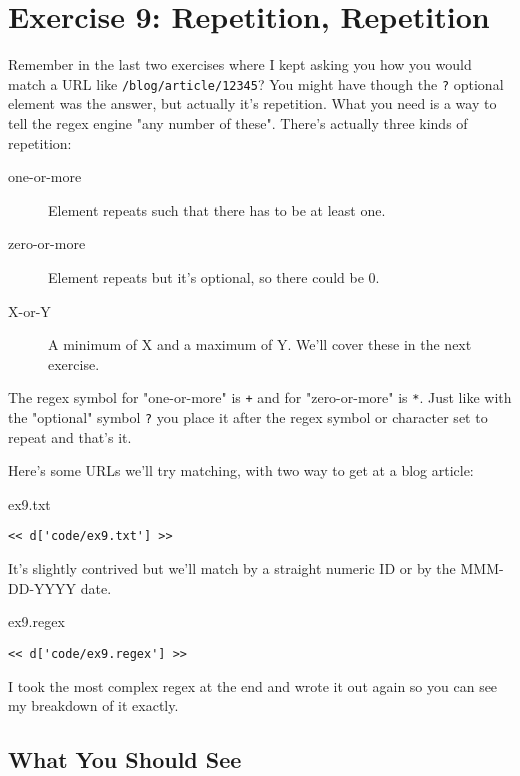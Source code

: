 \chapter{Exercise 9: Repetition, Repetition}

Remember in the last two exercises where I kept asking you how you would match
a URL like \verb|/blog/article/12345|? You might have though the \verb|?| optional
element was the answer, but actually it's repetition.  What you need is a way to
tell the regex engine "any number of these".  There's actually three kinds of
repetition:

\begin{description}
\item[one-or-more] Element repeats such that there has to be at least one.
\item[zero-or-more] Element repeats but it's optional, so there could be 0.
\item[X-or-Y] A minimum of X and a maximum of Y. We'll cover these in the next
    exercise.
\end{description}

The regex symbol for "one-or-more" is \verb|+| and for "zero-or-more" is \verb|*|.
Just like with the "optional" symbol \verb|?| you place it after the regex
symbol or character set to repeat and that's it.

Here's some URLs we'll try matching, with two way to get at a blog article:

\begin{code}{ex9.txt}
\begin{Verbatim}
<< d['code/ex9.txt'] >>
\end{Verbatim}
\end{code}

It's slightly contrived but we'll match by a straight numeric ID or by
the MMM-DD-YYYY date.

\begin{code}{ex9.regex}
\begin{Verbatim}
<< d['code/ex9.regex'] >>
\end{Verbatim}
\end{code}

I took the most complex regex at the end and wrote it out again so you
can see my breakdown of it exactly.

\section{What You Should See}


